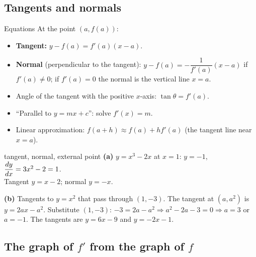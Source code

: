 \subsection{Tangents and normals}
\label{sec:tangent}

\begin{cols}
\begin{keyres}{Equations}
At the point $(a,f(a))$:
\begin{itemize}
  \item \textbf{Tangent:} $y-f(a)=f'(a)(x-a)$.
  \item \textbf{Normal} (perpendicular to the tangent): $y-f(a)=-\dfrac{1}{f'(a)}(x-a)$ if $f'(a)\ne0$; if $f'(a)=0$ the normal is the vertical line $x=a$.
  \item Angle of the tangent with the positive $x$-axis: $\tan\theta=f'(a)$.
  \item ``Parallel to $y=mx+c$'': solve $f'(x)=m$.
  \item Linear approximation: $f(a+h)\approx f(a)+hf'(a)$ (the tangent line near $x=a$).
\end{itemize}
\end{keyres}
\nextcol
\begin{example}{tangent, normal, external point \byhand}
\textbf{(a)} $y=x^3-2x$ at $x=1$: $y=-1$, $\dfrac{dy}{dx}=3x^2-2=1$.\\ Tangent $y=x-2$; normal $y=-x$.\par
\textbf{(b)} Tangents to $y=x^2$ that pass through $(1,-3)$. The tangent at $(a,a^2)$ is $y=2ax-a^2$. Substitute $(1,-3)$: $-3=2a-a^2\Rightarrow a^2-2a-3=0\Rightarrow a=3$ or $a=-1$. The tangents are $y=6x-9$ and $y=-2x-1$.
\end{example}
\end{cols}

\subsection{The graph of $f'$ from the graph of $f$}
\label{sec:gradgraph}

